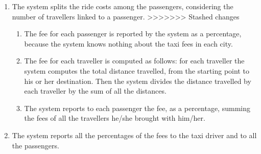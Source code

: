 \begin{enumerate}
	\item The system splits the ride costs among the passengers, considering the number of travellers linked to a passenger.
>>>>>>> Stashed changes
	\begin{enumerate}
		\item The fee for each passenger is reported by the system as a percentage, because the system knows nothing about the taxi fees in each city.
		\item The fee for each traveller is computed as follows: for each traveller the system computes the total distance travelled, from the starting point to his or her destination. Then the system divides the distance travelled by each traveller by the sum of all the distances.
		\item The system reports to each passenger the fee, as a percentage, summing the fees of all the travellers he/she brought with him/her.
	\end{enumerate}
	\item The system reports all the percentages of the fees to the taxi driver and to all the passengers.
\end{enumerate}
